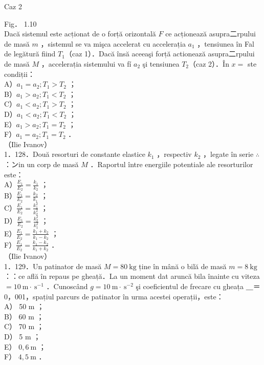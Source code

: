 \documentclass[10pt]{article}
\begin{document}
Caz 2

Fig． 1.10\\
Dacă sistemul este acționat de o forță orizontală $F$ ce acționează asupra二rpului de masă $m$ ，sistemul se va mişca accelerat cu accelerația $a_{1}$ ，tensiunea în Fal de legătură fiind $T_{1}$（caz 1）．Dacă însă aceeaşi forță actionează asupra二rpului de masă $M$ ，accelerația sistemului va fí $a_{2}$ şi tensiunea $T_{2}$（caz 2）．În $x=$ ste condiții：\\
A）$a_{1}=a_{2} ; T_{1}>T_{2}$ ；\\
B）$a_{1}>a_{2} ; T_{1}<T_{2}$ ；\\
C）$a_{1}<a_{2} ; T_{1}>T_{2}$ ；\\
D）$a_{1}<a_{2} ; T_{1}<T_{2}$ ；\\
E）$a_{1}>a_{2} ; T_{1}=T_{2}$ ；\\
F）$a_{1}=a_{2} ; T_{1}=T_{2}$ ．\\
（Ilie Ivanov）\\
1．128．Două resorturi de constante elastice $k_{1}$ ，respectiv $k_{2}$ ，legate în serie $\therefore$ ：ンin un corp de masă $M$ ．Raportul între energiile potentiale ale resorturilor este：\\
A）$\frac{E_{1}}{E_{2}}=\frac{k_{1}}{k_{2}}$ ；\\
B）$\frac{E_{1}}{E_{2}}=\frac{k_{2}}{k_{1}}$ ；\\
C）$\frac{E_{1}}{E_{2}}=\frac{k_{1}^{2}}{k_{2}^{2}}$ ；\\
D）$\frac{E_{1}}{E_{2}}=\frac{k_{2}^{2}}{k_{1}^{2}}$ ；\\
E）$\frac{E_{1}}{E_{2}}=\frac{k_{1}+k_{2}}{k_{1}-k_{2}}$ ；\\
F）$\frac{E_{1}}{E_{2}}=\frac{k_{1}-k_{2}}{k_{1}+k_{2}}$ ．\\
（Ilie Ivanov）\\
1．129．Un patinator de masă $M=80 \mathrm{~kg}$ ține în mână o bilă de masă $m=8 \mathrm{~kg}$ ：：ce află în repaus pe gheață．La un moment dat aruncă bila înainte cu viteza $=10 \mathrm{~m} \cdot \mathrm{~s}^{-1}$ ．Cunoscând $g=10 \mathrm{~m} \cdot \mathrm{~s}^{-2}$ şi coeficientul de frecare cu gheața ＿＝0，001，spațiul parcurs de patinator în urma acestei operații，este：\\
A） 50 m ；\\
B） 60 m ；\\
C） 70 m ；\\
D） 5 m ；\\
E） $0,6 \mathrm{~m}$ ；\\
F） $4,5 \mathrm{~m}$ ．\\
\end{document}

